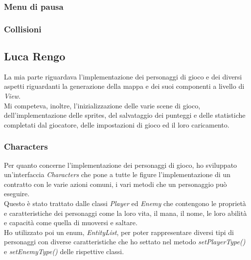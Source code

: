 \subsubsection{Menu di pausa}

\subsubsection{Collisioni}


\newpage

\subsection*{Luca Rengo}

\textsf{\small La mia parte riguardava l'implementazione dei personaggi di gioco e dei diversi aspetti riguardanti la generazione della mappa e dei suoi componenti a livello di \emph{View}.}\\

\textsf{\small Mi competeva, inoltre, l'inizializzazione delle varie scene di gioco, dell'implementazione delle sprites, del salvataggio dei punteggi e delle statistiche completati dal giocatore, delle impostazioni di gioco ed il loro caricamento.}\\ 

\subsubsection*{Characters}

\textsf{\small Per quanto concerne l'implementazione dei personaggi di gioco, ho sviluppato un'interfaccia \emph{Characters} che pone a tutte le figure l'implementazione di un contratto con le varie azioni comuni, i vari metodi che un personaggio può eseguire.}\\

\textsf{\small Questo è stato trattato dalle classi \emph{Player} ed \emph{Enemy} che contengono le proprietà e caratteristiche dei personaggi come la loro vita, il mana, il nome, le loro abilità e capacità come quella di muoversi e saltare.}\\

\textsf{\small Ho utilizzato poi un enum, \emph{EntityList}, per poter rappresentare diversi tipi di personaggi con diverse caratteristiche che ho settato nel metodo \emph{setPlayerType()} e \emph{setEnemyType()} delle rispettive classi. }\\

